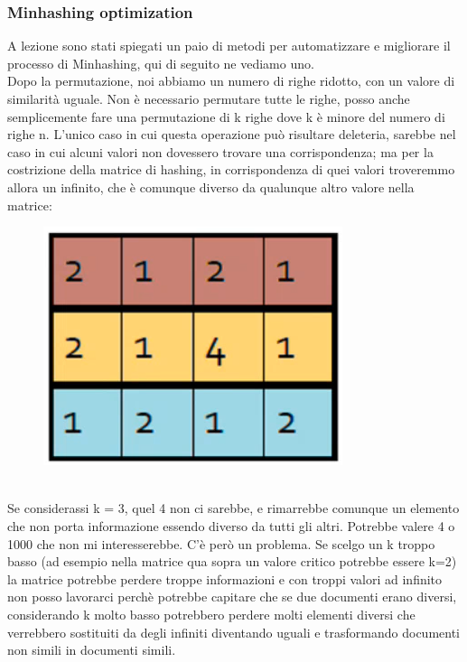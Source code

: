 \subsubsection{Minhashing optimization}
A lezione sono stati spiegati un paio di metodi per automatizzare e migliorare il processo di Minhashing, qui di seguito ne vediamo uno.
\\
Dopo la permutazione, noi abbiamo un numero di righe ridotto, con un valore di similarità uguale. Non è necessario permutare tutte le righe, posso anche semplicemente fare una permutazione di k righe dove k è minore del numero di righe n. L'unico caso in cui questa operazione può risultare deleteria, sarebbe nel caso in cui alcuni valori non dovessero trovare una corrispondenza; ma per la costrizione della matrice di hashing, in corrispondenza di quei valori troveremmo allora un infinito, che è comunque diverso da qualunque altro valore nella matrice:
\\
\begin{figure}[th]
    \centering
    \includegraphics[scale=0.5]{FrequentItems/img/matrixa.png}
\end{figure}
\\
Se considerassi k = 3, quel 4 non ci sarebbe, e rimarrebbe comunque un elemento che non porta informazione essendo diverso da tutti gli altri. Potrebbe valere 4 o 1000 che non mi interesserebbe. C'è però un problema. Se scelgo un k troppo basso (ad esempio nella matrice qua sopra un valore critico potrebbe essere k=2) la matrice potrebbe perdere troppe informazioni e con troppi valori ad infinito non posso lavorarci perchè potrebbe capitare che se due documenti erano diversi, considerando k molto basso potrebbero perdere molti elementi diversi che verrebbero sostituiti da degli infiniti diventando uguali e trasformando documenti non simili in documenti simili. 


